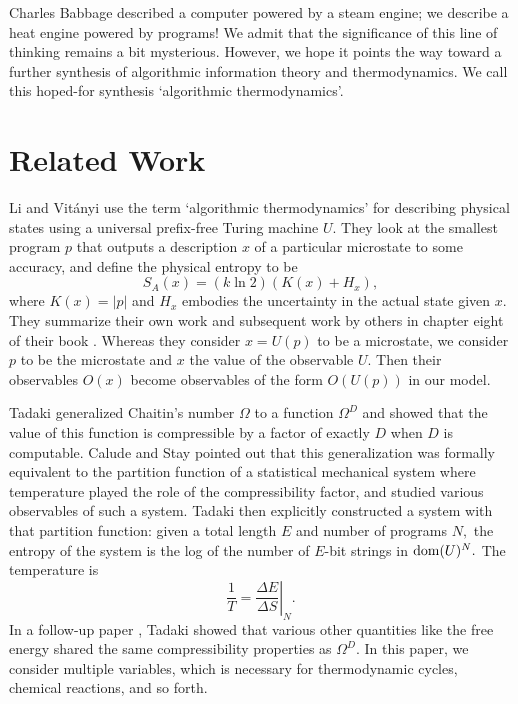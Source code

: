 \documentclass{article}
\newcommand{\dom}{{\rm dom}}
\begin{document}
Charles Babbage described a computer powered by a steam engine;
we describe a heat engine powered by programs!  We admit
that the significance of this line of thinking remains a bit 
mysterious.  However, we hope it points the way toward a further 
synthesis of algorithmic information theory and thermodynamics.
We call this hoped-for synthesis `algorithmic thermodynamics'.

\section{Related Work}

Li and Vit\'anyi use the term `algorithmic thermodynamics' for describing
physical states using a universal prefix-free Turing machine $U$.  
They look at the smallest program $p$ that outputs a 
description $x$ of a particular microstate to some 
accuracy, and define the physical entropy to be
\[ S_A(x) = (k \ln 2)(K (x) + H_x), \]
where $K(x) = |p|$ and $H_x$ embodies the uncertainty in the actual state given $x$.
They summarize their own work and subsequent work by others in chapter 
eight of their book \cite{LV}.  Whereas they consider $x=U(p)$ to be a
microstate, we consider $p$ to be the microstate and $x$ the value of
the observable $U$.  Then their observables $O(x)$ become observables
of the form $O(U(p))$ in our model.
 
Tadaki \cite{Tadaki2002} generalized Chaitin's number $\Omega$ to a function 
$\Omega^D$ and showed that the value of this function 
is compressible by a factor of exactly $D$ when $D$ is computable.
Calude and Stay \cite{CSNatural2006} pointed out that this generalization 
was formally equivalent to the partition function of a statistical
mechanical system where temperature played the role of the compressibility
factor, and studied various observables of such a system. 
Tadaki \cite{Tadaki2008} then explicitly constructed a system with
that partition function: given a total length $E$ and number of programs
$N,$ the entropy of the system is the log of the number of $E$-bit strings 
in $\dom(U)^N.$  The temperature is
\[ \frac{1}{T} = \left.\frac{\Delta E}{\Delta S}\right|_N. \]
In a follow-up paper \cite{Tadaki2009}, Tadaki showed that various other 
quantities like the free energy shared the same compressibility properties
as $\Omega^D$.  In this paper, we consider multiple variables, which is
necessary for thermodynamic cycles, chemical reactions, and so forth.
\end{document}
